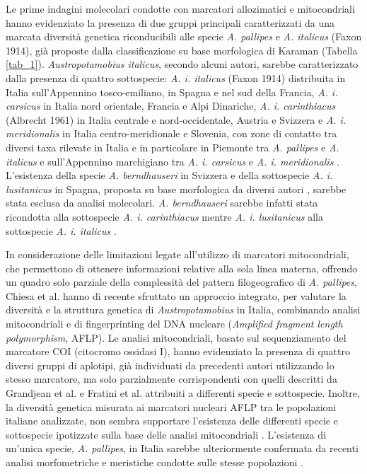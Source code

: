 \documentclass[11pt,a4paper,italian,twoside,openany]{memoir}
\newcommand{\etal}{et al. }
\begin{document}
Le prime indagini molecolari condotte con marcatori allozimatici \cite{Santucci 1997} \cite{Lortscher 1998} e mitocondriali \cite{Grandjean 2000} \cite{Fratini 2005} hanno evidenziato la presenza di due gruppi principali caratterizzati da una marcata diversità genetica riconducibili alle specie \emph{A. pallipes} e \emph{A. italicus} (Faxon 1914), già proposte dalla classificazione su base morfologica di Karaman \cite{Karaman 1962} (Tabella \ref{tab_1}). \emph{Austropotamobius italicus}, secondo alcuni autori, sarebbe caratterizzato dalla presenza di quattro sottospecie: \emph{A. i. italicus} (Faxon 1914) distribuita in Italia sull'Appennino tosco-emiliano, in Spagna e nel sud della Francia, \emph{A. i. carsicus} \cite{Karaman 1962} in Italia nord orientale, Francia e Alpi Dinariche, \emph{A. i. carinthiacus} (Albrecht 1961) in Italia centrale e nord-occidentale, Austria e Svizzera e \emph{A. i. meridionalis} \cite{Fratini 2005} in Italia centro-meridionale e Slovenia, con zone di contatto tra diversi taxa rilevate in Italia e in particolare in Piemonte tra \emph{A. pallipes} e \emph{A. italicus} e sull'Appennino marchigiano tra \emph{A. i. carsicus} e \emph{A. i. meridionalis} \cite{Santucci 1997} \cite{Grandjean 2000} \cite{Zaccara 2004} \cite{Fratini 2005} \cite{Cataudella 2006}. L'esistenza della specie \emph{A. berndhauseri} in Svizzera e della sottospecie \emph{A. i. lusitanicus} in Spagna, proposta su base morfologica da diversi autori \cite{Bott 1950} \cite{Karaman 1962} \cite{Brodski 1983} \cite{Largiader 2000}, sarebbe stata esclusa da analisi molecolari. \emph{A. berndhauseri} sarebbe infatti stata ricondotta alla sottospecie \emph{A. i. carinthiacus} mentre \emph{A. i. lusitanicus} alla sottospecie \emph{A. i. italicus} \cite{Santucci 1997} \cite{Grandjean 2000}.

In considerazione delle limitazioni legate all'utilizzo di marcatori mitocondriali, che permettono di ottenere informazioni relative alla sola linea materna, offrendo un quadro solo parziale della complessità del pattern filogeografico di \emph{A. pallipes}, Chiesa \etal \cite{Chiesa 2011} hanno di recente sfruttato un approccio integrato, per valutare la diversità e la struttura genetica di \emph{Austropotamobius} in Italia, combinando analisi mitocondriali e di fingerprinting del DNA nucleare (\emph{Amplified fragment length polymorphism}, AFLP). Le analisi mitocondriali, basate sul sequenziamento del marcatore COI (citocromo ossidasi I), hanno evidenziato la presenza di quattro diversi gruppi di aplotipi, già individuati da precedenti autori \cite{Trontelj 2005} \cite{Stefani 2011} utilizzando lo stesso marcatore, ma solo parzialmente corrispondenti con quelli descritti da Grandjean \etal \cite{Grandjean 2002} e Fratini \etal \cite{Fratini 2005} attribuiti a differenti specie e sottospecie. Inoltre, la diversità genetica misurata ai marcatori nucleari AFLP tra le popolazioni italiane analizzate, non sembra supportare l'esistenza delle differenti specie e sottospecie ipotizzate sulla base delle analisi mitocondriali \cite{Chiesa 2011}. L'esistenza di un'unica specie, \emph{A. pallipes}, in Italia sarebbe ulteriormente confermata da recenti analisi morfometriche e meristiche condotte sulle stesse popolazioni \cite{Scalici 2012}.
\end{document}
